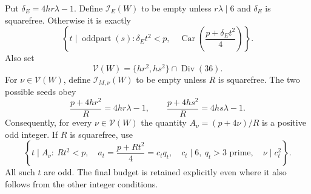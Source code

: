 Put $\delta_E=4hr\lambda-1$. Define $\mathcal I_E(W)$ to be empty unless
$r\lambda\mid6$ and $\delta_E$ is squarefree. Otherwise it is exactly
\begin{equation}\label{eq:Efibre}
 \left\{t\mid\operatorname{oddpart}(s):
  \delta_Et^2<p,\quad
  \operatorname{Car}\left(\frac{p+\delta_Et^2}{4}\right)\right\}.
\end{equation}
Also set
\[
 \mathcal V(W)=\{hr^2,hs^2\}\cap\operatorname{Div}(36).
\]
For $\nu\in\mathcal V(W)$, define $\mathcal I_{M,\nu}(W)$ to be empty
unless $R$ is squarefree.  The two possible seeds obey
\[
 \frac{p+4hr^2}{R}=4hr\lambda-1,
 \qquad
 \frac{p+4hs^2}{R}=4hs\lambda-1.
\]
Consequently, for every $\nu\in\mathcal V(W)$ the quantity
$A_\nu=(p+4\nu)/R$ is a positive odd integer.  If $R$ is squarefree, use
\begin{equation}\label{eq:Mfibre}
 \left\{t\mid A_\nu:\ Rt^2<p,\quad
  a_t=\frac{p+Rt^2}{4}=c_tq_t,\quad c_t\mid6,
  \ q_t>3\text{ prime},\quad \nu\mid c_t^2\right\}.
\end{equation}
All such $t$ are odd. The final budget is retained explicitly even where it
also follows from the other integer conditions.

